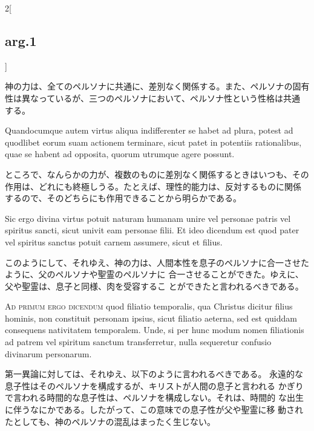 \documentclass[paper=a4paper,fontsize=10pt,jafontsize=9pt,titlepage]{jlreq}
\begin{document}
\begin{paracol}{2}[\subsection{arg.1}]
\switchcolumn

神の力は、全てのペルソナに共通に、差別なく関係する。また、ペルソナの固有
 性は異なっているが、三つのペルソナにおいて、ペルソナ性という性格は共通
 する。

\switchcolumn*

Quandocumque autem virtus
aliqua indifferenter se habet ad plura, potest ad quodlibet eorum suam
actionem terminare, sicut patet in potentiis rationalibus, quae se
habent ad opposita, quorum utrumque agere possunt.

\switchcolumn

ところで、なんらかの力が、複数のものに差別なく関係するときはいつも、その
 作用は、どれにも終極しうる。たとえば、理性的能力は、反対するものに関係
 するので、そのどちらにも作用できることから明らかである。

\switchcolumn*

Sic ergo divina
virtus potuit naturam humanam unire vel personae patris vel spiritus
sancti, sicut univit eam personae filii. Et ideo dicendum est quod pater
vel spiritus sanctus potuit carnem assumere, sicut et filius.

\switchcolumn

このようにして、それゆえ、神の力は、人間本性を息子のペルソナに合一させたように、父のペルソナや聖霊のペルソナに
 合一させることができた。ゆえに、父や聖霊は、息子と同様、肉を受容するこ
 とができたと言われるべきである。

\switchcolumn*[\subsection{ad.1}]

{\scshape Ad primum ergo dicendum} quod filiatio temporalis, qua Christus dicitur
filius hominis, non constituit personam ipsius, sicut filiatio aeterna,
sed est quiddam consequens nativitatem temporalem. Unde, si per hunc
modum nomen filiationis ad patrem vel spiritum sanctum transferretur,
nulla sequeretur confusio divinarum personarum.

\switchcolumn

第一異論に対しては、それゆえ、以下のように言われるべきである。
永遠的な息子性はそのペルソナを構成するが、キリストが人間の息子と言われる
 かぎりで言われる時間的な息子性は、ペルソナを構成しない。それは、時間的
 な出生に伴うなにかである。したがって、この意味での息子性が父や聖霊に移
 動されたとしても、神のペルソナの混乱はまったく生じない。

\switchcolumn*[\subsection{ad.2}]


\end{paracol}
\end{document}
